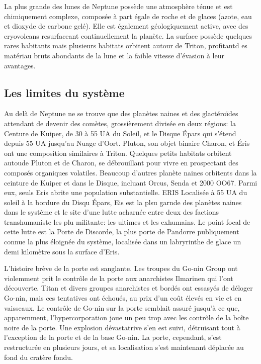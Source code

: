 La plus grande des lunes de Neptune possède une atmosphère ténue et est chimiquement complexe, composée à part égale de roche et de glaces (azote, eau et dioxyde de carbone gelé). Elle est également géologiquement active, avec des cryovolcans resurfaceant continuellement la planète. La surface possède quelques rares habitants mais plusieurs habitats orbitent autour de Triton, profitantd es matériau bruts abondants de la lune et la faible vitesse d'évasion à leur avantages. 

\subsection{Les limites du système} \label{sec:edge-system} 

Au delà de Neptune ne se trouve que des planètes naines et des glactéroïdes attendant de devenir des comètes, grossièrement divisée en deux régions: la Centure de Kuiper, de 30 à 55 UA du Soleil, et le Disque Épars qui s'étend depuis 55 UA jusqu'au Nuage d'Oort. Pluton, son objet binaire Charon, et Éris ont une composition similaires à Triton. Quelques petits habitats orbitent autoude Pluton et de Charon, se débrouillant pour vivre en prospectant des composés organiques volatiles. Beaucoup d'autres planète naines orbitents dans la ceinture de Kuiper et dans le Disque, incluant Orcus, Senda et 2000 OO67. Parmi eux, seuls Eris abrite une population substantielle. ERIS Localisée à 55 UA du soleil à la bordure du Disqu Épars, Eis est la plsu garnde des planètes naines dans le système et le site d'une lutte acharnée entre deux des factions transhumaniste les plu militante: les ultimes et les exhumains. Le point focal de cette lutte est la Porte de Discorde, la plus porte de Pandorre publiquement connue la plus éloignée du système, localisée dans un labryrinthe de glace un demi kilomètre sous la surface d'Eris. 

L'histoire brève de la porte est sanglante. Les troupes du Go-nin Group ont violemment prit le contrôle de la porte aux anarchistes Ilmarinen qui l'ont découverte. Titan et divers groupes anarchistes et bordés ont essasyés de déloger Go-nin, mais ces tentatives ont échoués, au prix d'un coût élevés en vie et en vaisseaux. Le contrôle de Go-nin sur la porte semblait assuré jusqu'à ce que, apparemment, l'hypercorporation joue un peu trop avec les contrôle de la boîte noire de la porte. Une explosion dévastatrive s'en est suivi, détruisant tout à l'exception de la porte et de la base Go-nin. La porte, cependant, s'est restructurée en plusieurs jours, et sa localisation s'est maintenant déplacée au fond du cratère fondu. 

